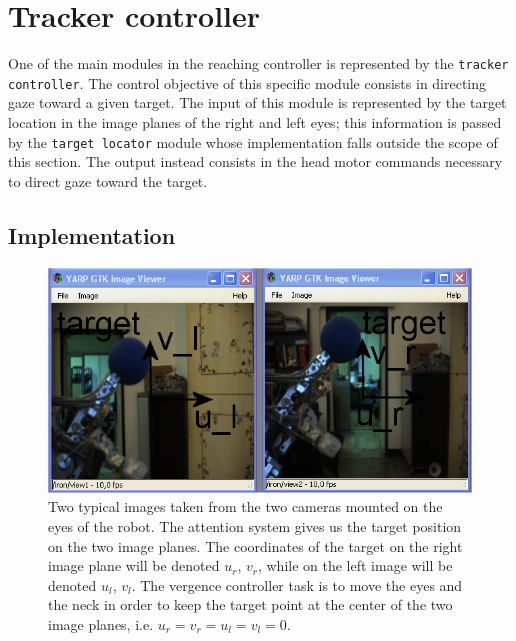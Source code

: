 \section{Tracker controller}

One of the main modules in the reaching controller is represented by the {\tt tracker controller}. The control objective of this specific module consists in directing gaze toward a given target. The input of this module is represented by the target location in the image planes of the right and left eyes; this information is passed by the {\tt target locator} module whose implementation falls outside the scope of this section. The output instead consists in the head motor commands necessary to direct gaze toward the target. 

\subsection{Implementation}

\begin{figure}[tbp]
\centering
\includegraphics[width=120mm]{Figure/SteroImages.jpg}
\caption{Two typical images taken from the two cameras mounted on the eyes of the robot. The attention system gives us the target position on the two image planes. The coordinates of the target on the right image plane will be denoted $u_r$, $v_r$, while on the left image will be denoted $u_l$, $v_l$. The vergence controller task is to move the eyes and the neck in order to keep the target point at the center of the two image planes, i.e. $u_r = v_r = u_l = v_l = 0$.}
\label{Fig:ImagePlane}
\end{figure}

